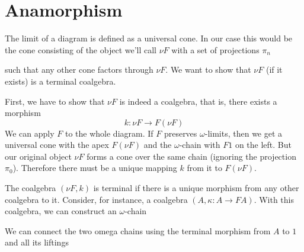 \documentclass[11pt]{amsart}
\begin{document}
\section{Anamorphism}

The limit of a diagram is defined as a universal cone. In our case this would be the cone consisting of the object we'll call $\nu F$ with a set of projections $\pi_n$

\begin{figure}[H]
\centering
{}
\end{figure}
such that any other cone factors through $\nu F$. We want to show that $\nu F$ (if it exists) is a terminal coalgebra. 

First, we have to show that $\nu F$ is indeed a coalgebra, that is, there exists a morphism 
\[k \colon \nu F \to F (\nu F)\]
We can apply $F$ to the whole diagram. If $F$ preserves $\omega$-limits, then we get a universal cone with the apex $F (\nu F)$ and the $\omega$-chain with $F 1$ on the left. But our original object $\nu F$ forms a cone over the same chain (ignoring the projection $\pi_0$). Therefore there must be a unique mapping $k$ from it to $F (\nu F)$.

The coalgebra $(\nu F, k)$ is terminal if there is a unique morphism from any other coalgebra to it. Consider, for instance, a coalgebra $(A, \kappa \colon A \to F A)$. With this coalgebra, we can construct an $\omega$-chain
\begin{figure}[H]
\centering
{}
\end{figure}

We can connect the two omega chains using the terminal morphism from $A$ to $1$ and all its liftings

\begin{figure}[H]
\centering
{}
\end{figure}
\end{document}
